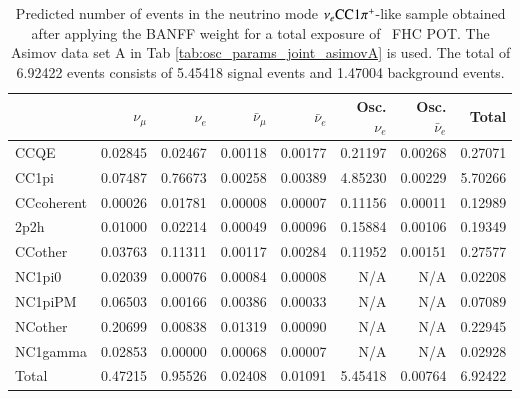 \begin{table}
	\centering
	\begin{tabular} { | l ||r | r | r | r | r | r | | r | }
	\hline
	              & $\nu_\mu$            & $\nu_e$              & $\bar{\nu}_{\mu}$    & $\bar{\nu}_{e}$      & Osc. $\nu_e$         & Osc. $\bar{\nu}_{e}$ & Total                \\ \hline\hline
	 CCQE         & 0.02845              & 0.02467              & 0.00118              & 0.00177              & 0.21197              & 0.00268              & 0.27071              \\ \hline
	 CC1pi        & 0.07487              & 0.76673              & 0.00258              & 0.00389              & 4.85230              & 0.00229              & 5.70266              \\ \hline
	 CCcoherent   & 0.00026              & 0.01781              & 0.00008              & 0.00007              & 0.11156              & 0.00011              & 0.12989              \\ \hline
	 2p2h         & 0.01000              & 0.02214              & 0.00049              & 0.00096              & 0.15884              & 0.00106              & 0.19349              \\ \hline
	 CCother      & 0.03763              & 0.11311              & 0.00117              & 0.00284              & 0.11952              & 0.00151              & 0.27577              \\ \hline
	 NC1pi0       & 0.02039              & 0.00076              & 0.00084              & 0.00008              & N/A                  & N/A                  & 0.02208              \\ \hline
	 NC1piPM      & 0.06503              & 0.00166              & 0.00386              & 0.00033              & N/A                  & N/A                  & 0.07089              \\ \hline
	 NCother      & 0.20699              & 0.00838              & 0.01319              & 0.00090              & N/A                  & N/A                  & 0.22945              \\ \hline
	 NC1gamma     & 0.02853              & 0.00000              & 0.00068              & 0.00007              & N/A                  & N/A                  & 0.02928              \\ \hline
	\hline
	 Total        & 0.47215              & 0.95526              & 0.02408              & 0.01091              & 5.45418              & 0.00764              & 6.92422              \\ \hline
	\end{tabular}
	\caption{Predicted number of events in the neutrino mode $\nu_{e} \textrm{CC}1\pi^{+}$-like sample obtained after applying the BANFF weight for a total exposure of \TotalPotNuRunOneNineC\ FHC POT. The Asimov data set A in Tab \ref{tab:osc_params_joint_asimovA} is used. The total of 6.92422 events consists of 5.45418 signal events and 1.47004 background events.}
	\label{tab:event_rates_exp_MultiRe}
\end{table}


